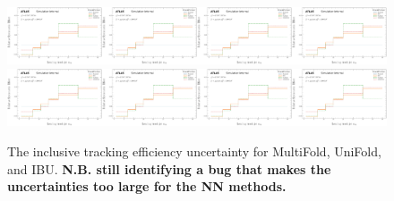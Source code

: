 \begin{figure}[h!]
\includegraphics[width=0.25\textwidth,page=9]{figures/SimResults/TrackJet_SystEffect.pdf}\includegraphics[width=0.25\textwidth,page=13]{figures/SimResults/TrackJet_SystEffect.pdf}\includegraphics[width=0.25\textwidth,page=41]{figures/SimResults/TrackJet_SystEffect.pdf}\includegraphics[width=0.25\textwidth,page=45]{figures/SimResults/TrackJet_SystEffect.pdf}\\
\includegraphics[width=0.25\textwidth,page=49]{figures/SimResults/TrackJet_SystEffect.pdf}\includegraphics[width=0.25\textwidth,page=53]{figures/SimResults/TrackJet_SystEffect.pdf}\includegraphics[width=0.25\textwidth,page=57]{figures/SimResults/TrackJet_SystEffect.pdf}\includegraphics[width=0.25\textwidth,page=61]{figures/SimResults/TrackJet_SystEffect.pdf}
\caption{The inclusive tracking efficiency uncertainty for MultiFold, UniFold, and IBU.  \textbf{N.B. still identifying a bug that makes the uncertainties too large for the NN methods.}}
\label{fig:simresultsmulti_trackjetuncertsl1}
\end{figure}

